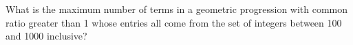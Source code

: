 What is the maximum number of terms in a geometric progression with common ratio greater than 1 whose entries all come from the set of integers between 100 and 1000 inclusive?